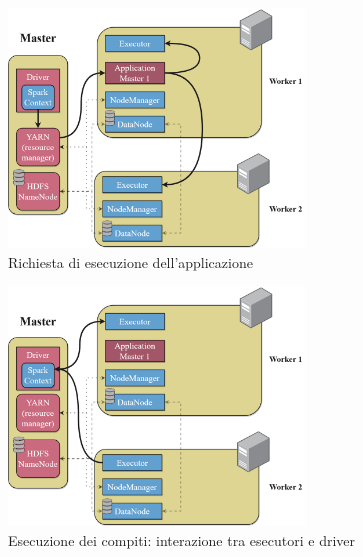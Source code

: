 \begin{figure}[hbt!]
    \centering
    \includegraphics[width=0.7\textwidth]{img/architecture/application_submit2.png}
    \caption{Richiesta di esecuzione dell'applicazione}
    \label{fig:application_submit}
\end{figure}

\begin{figure}[hbt!]
    \centering
    \includegraphics[width=0.7\textwidth]{img/architecture/jobs_execution2.png}
    \caption{Esecuzione dei compiti: interazione tra esecutori e driver}
    \label{fig:jobs_execution}
\end{figure}

